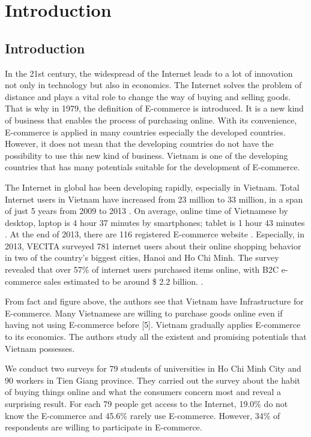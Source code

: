 \documentclass[conference]{IEEEtran}
\begin{document}
\section{Introduction} \label{intro}
\subsection{Introduction}
In the 21st century, the widespread of the Internet leads to a lot of innovation not only in technology but also in economics. The Internet solves the problem of distance and plays a vital role to change the way of buying and selling goods. That is why in 1979, the definition of E-commerce is introduced. It is a new kind of business that enables the process of purchasing online. With its convenience, E-commerce is applied in many countries especially the developed countries. However, it does not mean that the developing countries do not have the possibility to use this new kind of business. Vietnam is one of the developing countries that has many potentials suitable for the development of E-commerce.

The Internet in global has been developing rapidly, especially in Vietnam. Total Internet users in Vietnam have increased from 23 million to 33 million, in a span of just 5 years from 2009 to 2013 \cite{InfoAndData2014}. On average, online time of Vietnamese by desktop, laptop is 4 hour 37 minutes by smartphones; tablet is 1 hour 43 minutes \cite{VietnamMobile2014}. At the end of 2013, there are 116 registered E-commerce website \cite{VietnamMobile2013}. Especially, in 2013, VECITA surveyed 781 internet users about their online shopping behavior in two of the country’s biggest cities, Hanoi and Ho Chi Minh. The survey revealed that over 57\% of internet users purchased items online, with B2C e-commerce sales estimated to be around \$ 2.2 billion. \cite{vecita}.

From fact and figure above, the authors see that Vietnam have Infrastructure for E-commerce. Many Vietnamese are willing to purchase goods online even if having not using E-commerce before [5]. Vietnam gradually applies E-commerce to its economics. The authors study all the existent and promising potentials that Vietnam possesses.

We conduct two surveys for 79 students of universities in Ho Chi Minh City and 90 workers in Tien Giang province. They carried out the survey about the habit of buying things online and what the consumers concern most and reveal a surprising result. For each 79 people get access to the Internet, 19.0\% do not know the E-commerce and 45.6\% rarely use E-commerce. However, 34\% of  respondents are willing to participate in E-commerce.
\end{document}
